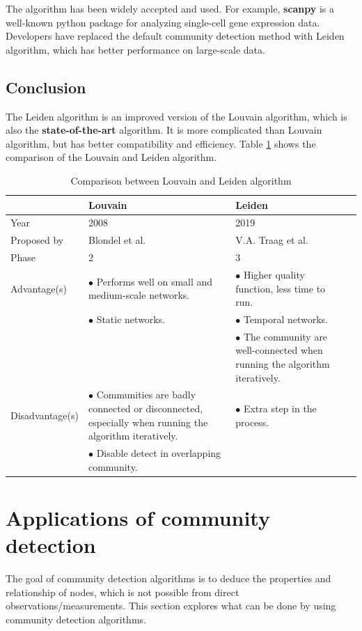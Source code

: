 \documentclass[11pt]{article}
\begin{document}
\noindent The algorithm has been widely accepted and used. For example, \textbf{scanpy} is a well-known python package for analyzing single-cell gene expression data.\cite{scanpy} Developers have replaced the default community detection method with Leiden algorithm, which has better performance on large-scale data.


\subsection{Conclusion}
The Leiden algorithm is an improved version of the Louvain algorithm, which is also the \textbf{state-of-the-art} algorithm. It is more complicated than Louvain algorithm, but has better compatibility and efficiency.
Table \ref{tab:compare} shows the comparison of the Louvain and Leiden algorithm.
\begin{table}[!htbp]
	\centering
	\caption{Comparison between Louvain and Leiden algorithm}
	\begin{tabularx}{\textwidth}{lXXX}
		\toprule
		&  \textbf{Louvain} & \textbf{Leiden}  \\
		\midrule
  Year            & 2008& 2019\\
  Proposed by     & Blondel et al.& V.A. Traag et al.\\
  Phase           & 2 & 3 \\
  Advantage(s)    & $\bullet$ Performs well on small and medium-scale networks.  &  $\bullet$ Higher quality function, less time to run. \\
                  & $\bullet$ Static networks.   & $\bullet$ Temporal networks. \\
                  &                    & $\bullet$ The community are well-connected when running the algorithm iteratively. \\ 
  Disadvantage(s) & $\bullet$ Communities are badly connected or disconnected, especially when running the algorithm iteratively.  & $\bullet$ Extra step in the process.  \\
                  & $\bullet$ Disable detect in overlapping community. & \\
		\bottomrule
	\end{tabularx}
	\label{tab:compare}
\end{table}

\section{Applications of community detection}
The goal of community detection algorithms is to deduce the properties and relationship of nodes, which is not possible from direct observations/measurements.
This section explores what can be done by using community detection algorithms. 
\end{document}
